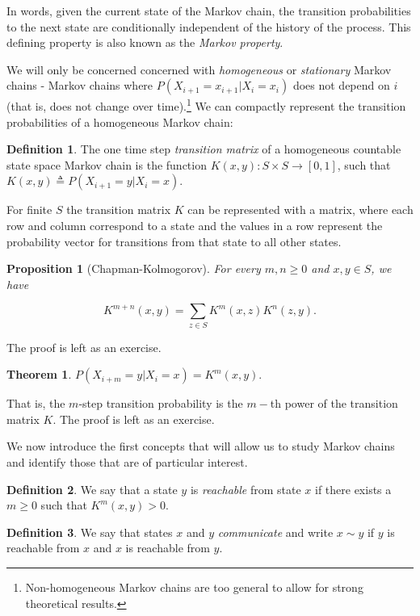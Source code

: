 \documentclass{book}
\theoremstyle{plain}%
\newtheorem{theorem}{Theorem}[section]
\newtheorem{proposition}{Proposition}[section]
\theoremstyle{definition}
\newtheorem{definition}{Definition}[section]
\newlength{\arrow}
\begin{document}
In words, given the current state of the Markov chain, the transition probabilities to the next state are conditionally independent of the history of the process. This defining property is also known as the \emph{Markov property}.

We will only be concerned concerned with \emph{homogeneous} or \emph{stationary} Markov chains - Markov chains where $P(X_{i+1} = x_{i+1}|X_{i} = x_{i})$ does not depend on $i$ (that is, does not change over time).\footnote{Non-homogeneous Markov chains are too general to allow for strong theoretical results.} We can compactly represent the transition probabilities of a homogeneous Markov chain:

\begin{definition} The one time step \emph{transition matrix} of a homogeneous countable state space Markov chain is the function $K(x,y): S \times S \rightarrow [0,1]$, such that  $K(x,y) \triangleq P(X_{i+1} = y|X_{i} = x)$.
\end{definition}

For finite $S$ the transition matrix $K$ can be represented with a matrix, where each row and column correspond to a state and the values in a row represent the probability vector for transitions from that state to all other states.

\begin{proposition}[Chapman-Kolmogorov] For every $m, n \geq 0$ and $x, y \in S$, we have

$$K^{m+n}(x, y) = \sum_{z \in S} K^m(x,z)K^n(z,y).$$
\label{prop:chapman}
\end{proposition}

The proof is left as an exercise.

\begin{theorem}
$P(X_{i+m} = y|X_{i} = x) = K^m(x, y).$
\label{thm:chapman}
\end{theorem}

That is, the $m$-step transition probability is the $m-$th power of the transition matrix $K$. The proof is left as an exercise.

We now introduce the first concepts that will allow us to study Markov chains and identify those that are of particular interest.

\begin{definition} We say that a state $y$ is \emph{reachable} from state $x$ if there exists a $m \geq 0$ such that $K^m(x,y) > 0$.
\end{definition}

\begin{definition} We say that states $x$ and $y$ \emph{communicate} and write $x \sim y$ if $y$ is reachable from $x$ and $x$ is reachable from $y$.
\end{definition}
\end{document}
